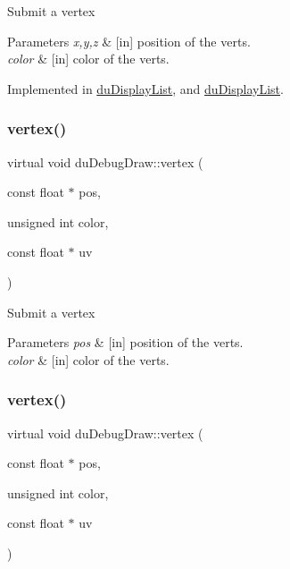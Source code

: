 Submit a vertex 
\begin{DoxyParams}{Parameters}
{\em x,y,z} & \mbox{[}in\mbox{]} position of the verts. \\
\hline
{\em color} & \mbox{[}in\mbox{]} color of the verts. \\
\hline
\end{DoxyParams}


Implemented in \hyperlink{classduDisplayList_af724f7566b2c1c2c09453dc064c6eecf}{du\+Display\+List}, and \hyperlink{classduDisplayList_aa98c1a7225f0af78674db24c75afe6f3}{du\+Display\+List}.

\mbox{\label{structduDebugDraw_a711146a2e4be2ef9e0d6de7be8c714bc}} 
\subsubsection{\texorpdfstring{vertex()}{vertex()}\hspace{0.1cm}{\footnotesize\ttfamily [5/8]}}
{\footnotesize\ttfamily virtual void du\+Debug\+Draw\+::vertex (\begin{DoxyParamCaption}\item[{const float $\ast$}]{pos,  }\item[{unsigned int}]{color,  }\item[{const float $\ast$}]{uv }\end{DoxyParamCaption})\hspace{0.3cm}{\ttfamily [pure virtual]}}

Submit a vertex 
\begin{DoxyParams}{Parameters}
{\em pos} & \mbox{[}in\mbox{]} position of the verts. \\
\hline
{\em color} & \mbox{[}in\mbox{]} color of the verts. \\
\hline
\end{DoxyParams}
\mbox{\label{structduDebugDraw_a711146a2e4be2ef9e0d6de7be8c714bc}} 
\subsubsection{\texorpdfstring{vertex()}{vertex()}\hspace{0.1cm}{\footnotesize\ttfamily [6/8]}}
{\footnotesize\ttfamily virtual void du\+Debug\+Draw\+::vertex (\begin{DoxyParamCaption}\item[{const float $\ast$}]{pos,  }\item[{unsigned int}]{color,  }\item[{const float $\ast$}]{uv }\end{DoxyParamCaption})\hspace{0.3cm}{\ttfamily [pure virtual]}}


